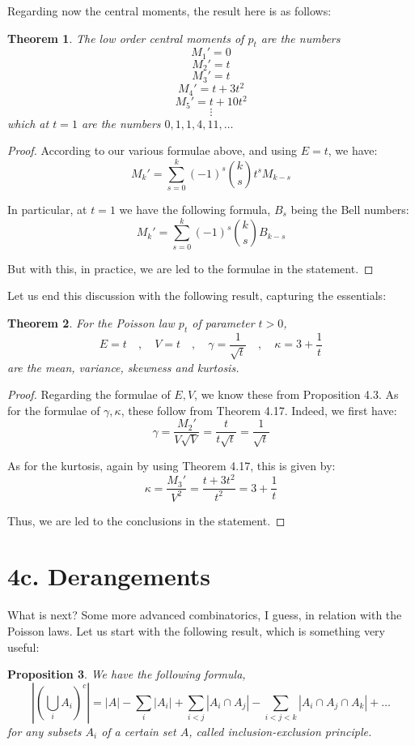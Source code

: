 \documentclass[12pt]{amsbook}
\newtheorem{theorem}{Theorem}[chapter]
\newtheorem{proposition}[theorem]{Proposition}
\begin{document}
Regarding now the central moments, the result here is as follows: 

\begin{theorem}
The low order central moments of $p_t$ are the numbers
$$M_1'=0$$
$$M_2'=t$$
$$M_3'=t$$
$$M_4'=t+3t^2$$
$$M_5'=t+10t^2$$
$$\vdots$$
which at $t=1$ are the numbers $0,1,1,4,11,\ldots$
\end{theorem}

\begin{proof}
According to our various formulae above, and using $E=t$, we have:
$$M_k'=\sum_{s=0}^k(-1)^s\binom{k}{s}t^sM_{k-s}$$

In particular, at $t=1$ we have the following formula, $B_s$ being the Bell numbers:
$$M_k'=\sum_{s=0}^k(-1)^s\binom{k}{s}B_{k-s}$$

But with this, in practice, we are led to the formulae in the statement.
\end{proof}

Let us end this discussion with the following result, capturing the essentials:

\begin{theorem}
For the Poisson law $p_t$ of parameter $t>0$,
$$E=t\quad,\quad  V=t\quad ,\quad \gamma=\frac{1}{\sqrt{t}}\quad ,\quad \kappa=3+\frac{1}{t}$$
are the mean, variance, skewness and kurtosis.
\end{theorem}

\begin{proof}
Regarding the formulae of $E,V$, we know these from Proposition 4.3. As for the formulae of $\gamma,\kappa$, these follow from Theorem 4.17. Indeed, we first have:
$$\gamma=\frac{M_2'}{V\sqrt{V}}=\frac{t}{t\sqrt{t}}=\frac{1}{\sqrt{t}}$$

As for the kurtosis, again by using Theorem 4.17, this is given by:
$$\kappa=\frac{M_3'}{V^2}=\frac{t+3t^2}{t^2}=3+\frac{1}{t}$$

Thus, we are led to the conclusions in the statement.
\end{proof}

\section*{4c. Derangements}

What is next? Some more advanced combinatorics, I guess, in relation with the Poisson laws. Let us start with the following result, which is something very useful:

\begin{proposition}
We have the following formula,
$$\left|\left(\bigcup_iA_i\right)^c\right|=|A|-\sum_i|A_i|+\sum_{i<j}|A_i\cap A_j|-\sum_{i<j<k}|A_i\cap A_j\cap A_k|+\ldots$$
for any subsets $A_i$ of a certain set $A$, called inclusion-exclusion principle.
\end{proposition}
\end{document}
